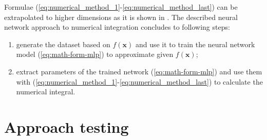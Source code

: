\documentclass[%
]{ittmm}
\begin{document}

Formulae (\ref{eq:numerical_method_1}-\ref{eq:numerical_method_last}) can be extrapolated to higher dimensions as it is shown in \cite{lloyd2020using}. The described neural network approach to numerical integration concludes to following steps:

\begin{enumerate}
    \item generate the dataset based on $f(\mathbf{x})$ and use it to train the neural network model (\ref{eq:math-form-mlp}) to approximate given $f(\mathbf{x})$;
    \item extract parameters of the trained network (\ref{eq:math-form-mlp}) and use them with (\ref{eq:numerical_method_1}-\ref{eq:numerical_method_last}) to calculate the numerical integral.
\end{enumerate}

\section{Approach testing}
\end{document}
